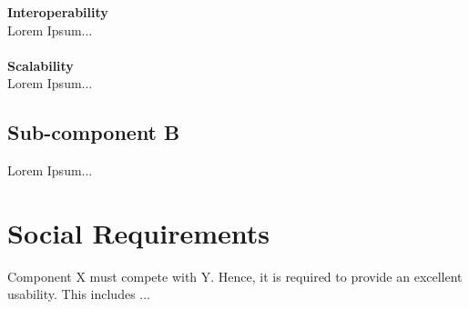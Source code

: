 \textbf{Interoperability}
\\
Lorem Ipsum...
\\
\\
\textbf{Scalability}
\\
Lorem Ipsum...

\subsection{Sub-component B\label{sec:reqsubb}}

Lorem Ipsum...

\section{Social Requirements\label{sec:socreq}}

Component X must compete with Y. Hence, it is required to provide an excellent usability. This includes ...

